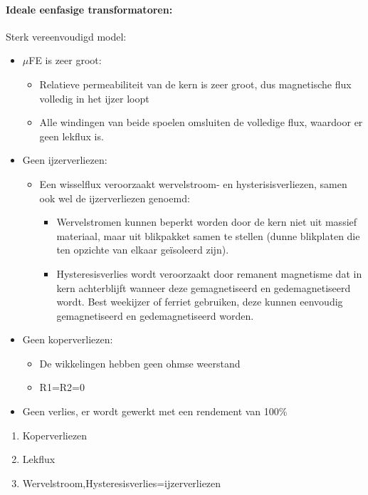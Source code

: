 \documentclass[12pt]{article}
\begin{document}
\paragraph{Ideale eenfasige transformatoren:}
Sterk vereenvoudigd model:\begin{itemize}
    \item $\mu$FE is zeer groot:\begin{itemize}
        \item Relatieve permeabiliteit van de kern is zeer groot, dus magnetische flux volledig in het ijzer loopt
        \item Alle windingen van beide spoelen omsluiten de volledige flux, waardoor er geen lekflux is.
    \end{itemize}
    \item Geen ijzerverliezen:\begin{itemize}
        \item Een wisselflux veroorzaakt wervelstroom- en hysterisisverliezen, samen ook wel de ijzerverliezen genoemd:\begin{itemize}
            \item Wervelstromen kunnen beperkt worden door de kern niet uit massief materiaal, maar uit blikpakket samen te stellen (dunne blikplaten die ten opzichte van elkaar geïsoleerd zijn).
            \item Hysteresisverlies wordt veroorzaakt door remanent magnetisme dat in kern achterblijft wanneer deze gemagnetiseerd en gedemagnetiseerd wordt. Best weekijzer of ferriet gebruiken, deze kunnen eenvoudig gemagnetiseerd en gedemagnetiseerd worden.
        \end{itemize}
    \end{itemize}
    \item Geen koperverliezen:\begin{itemize}
        \item De wikkelingen hebben geen ohmse weerstand
        \item R1=R2=0
    \end{itemize}
    \item Geen verlies, er wordt gewerkt met een rendement van 100\%
\end{itemize}
\begin{enumerate}
    \item Koperverliezen 
    \item Lekflux 
    \item Wervelstroom,Hysteresisverlies=ijzerverliezen
\end{enumerate}
\end{document}
